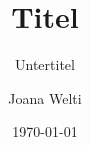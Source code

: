 \documentclass[fontsize=12pt,paper=a4]{scrartcl}
\begin{document}
\title{Titel}
\subtitle{Untertitel}
\date{\today}
\author{Joana Welti}
\maketitle

\tableofcontents








\end{document}
